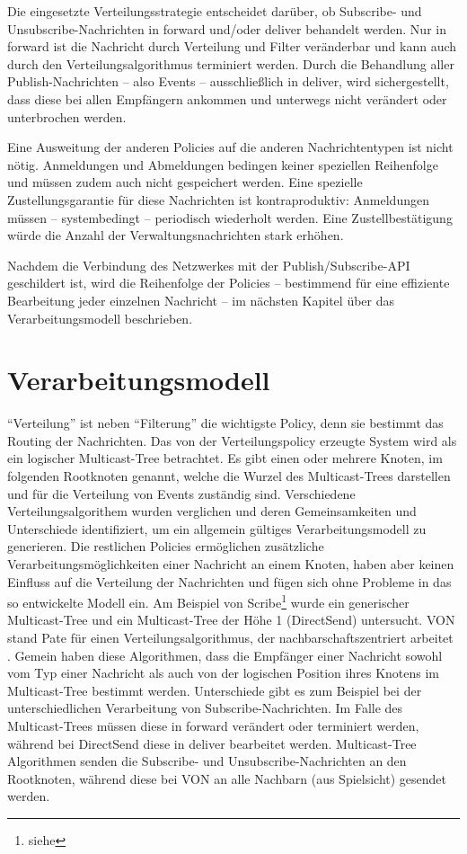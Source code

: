 Die eingesetzte Verteilungsstrategie entscheidet darüber, ob Subscribe- und Unsubscribe-Nachrichten in forward und/oder deliver behandelt werden. Nur in forward ist die Nachricht durch Verteilung und Filter veränderbar und kann auch durch den Verteilungsalgorithmus terminiert werden. Durch die Behandlung aller Publish-Nachrichten -- also Events -- ausschließlich in deliver, wird sichergestellt, dass diese bei allen Empfängern ankommen und unterwegs nicht verändert oder unterbrochen werden.

Eine Ausweitung der anderen Policies auf die anderen Nachrichtentypen ist nicht nötig. Anmeldungen und Abmeldungen bedingen keiner speziellen Reihenfolge und müssen zudem auch nicht gespeichert werden. Eine spezielle Zustellungsgarantie für diese Nachrichten ist kontraproduktiv:  Anmeldungen müssen -- systembedingt -- periodisch wiederholt werden. Eine Zustellbestätigung würde die Anzahl der Verwaltungsnachrichten stark erhöhen.

Nachdem die Verbindung des Netzwerkes mit der Publish/Subscribe-API geschildert ist, wird die Reihenfolge der Policies -- bestimmend für eine effiziente Bearbeitung jeder einzelnen Nachricht -- im nächsten Kapitel über das Verarbeitungsmodell beschrieben.

\section{Verarbeitungsmodell}
``Verteilung'' ist neben ``Filterung'' die wichtigste Policy, denn sie bestimmt das Routing der Nachrichten. Das von der Verteilungspolicy erzeugte System wird als ein logischer Multicast-Tree betrachtet. Es gibt einen oder mehrere Knoten, im folgenden Rootknoten genannt, welche die Wurzel des Multicast-Trees darstellen und für die Verteilung von Events zuständig sind. Verschiedene Verteilungsalgorithem wurden verglichen und deren Gemeinsamkeiten und Unterschiede identifiziert, um ein allgemein gültiges Verarbeitungsmodell zu generieren. Die restlichen Policies ermöglichen zusätzliche Verarbeitungsmöglichkeiten einer Nachricht an einem Knoten, haben aber keinen Einfluss auf die Verteilung der Nachrichten und fügen sich ohne Probleme in das so entwickelte Modell ein. Am Beispiel von Scribe\footnote{siehe } wurde ein generischer Multicast-Tree und ein Multicast-Tree der Höhe 1 (DirectSend) untersucht. VON stand Pate für einen Verteilungsalgorithmus, der nachbarschaftszentriert arbeitet \cite{Hu2006VON}. Gemein haben diese Algorithmen, dass die Empfänger einer Nachricht sowohl vom Typ einer Nachricht als auch von der logischen Position ihres Knotens im Multicast-Tree bestimmt werden. Unterschiede gibt es zum Beispiel bei der unterschiedlichen Verarbeitung von Subscribe-Nachrichten. Im Falle des Multicast-Trees müssen diese in forward verändert oder terminiert werden, während bei DirectSend diese in deliver bearbeitet werden. Multicast-Tree Algorithmen senden die Subscribe- und Unsubscribe-Nachrichten an den Rootknoten, während diese bei VON an alle Nachbarn (aus Spielsicht) gesendet werden.

